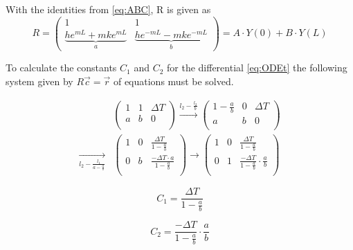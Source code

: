 With the identities from \autoref{eq:ABC}, R is given as
\begin{equation}
R = \begin{pmatrix}	1 & 1\\	\underbrace{he^{mL}+mke^{mL}}_{a} & \underbrace{he^{-mL}-mke^{-mL}}_{b} \end{pmatrix} = A \cdot Y(0)+B \cdot Y(L)
\end{equation}

To calculate the constants $C_1$ and $C_2$ for the differential \autoref{eq:ODEt} the following system given by $R \vec{c} = \vec{r}$ of equations must be solved.

\begin{equation}
\begin{aligned}
	&\left(\begin{array}{cc|c}
		1 & 1 & \Delta T \\
		a & b & 0 \\
	\end{array} \right)
	\xrightarrow[]{l_2 - \frac{l_2}{b}}
	\left(\begin{array}{cc|c}
		1-\frac{a}{b} & 0 & \Delta T \\
		a & b & 0  \\
	\end{array}\right)\\
	\xrightarrow[l_2-\frac{l_1}{a-\frac{a}{b}}]{}&
	\left(\begin{array}{cc|c}
		1 & 0 & \frac{\Delta T}{1- \frac{a}{b}}\\
		0 & b & \frac{-\Delta T \cdot a}{1-\frac{a}{b}}\\
	\end{array}\right)
	\rightarrow
	\left(\begin{array}{cc|c}
		1 & 0 & \frac{\Delta T}{1-\frac{a}{b}}\\
		0 & 1 & \frac{-\Delta T}{1-\frac{a}{b}} \cdot \frac{a}{b}\\
	\end{array}\right)
\end{aligned}
\end{equation}

\begin{equation}
C_1 = \frac{\Delta T}{1 - \frac{a}{b}}
\end{equation}

\begin{equation}
C_2 = \frac{-\Delta T}{1 - \frac{a}{b}} \cdot \frac{a}{b}
\end{equation}

